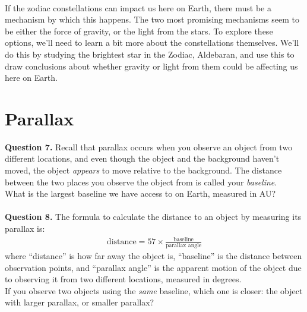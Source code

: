 \documentclass[11pt]{article}
\begin{document}
\vspace{1.5cm}
\hrulefill\\

If the zodiac constellations can impact us here on Earth, there must be a mechanism by which this happens. The two most promising mechanisms seem to be either the force of gravity, or the light from the stars. To explore these options, we'll need to learn a bit more about the constellations themselves. We'll do this by studying the brightest star in the Zodiac, Aldebaran, and use this to draw conclusions about whether gravity or light from them could be affecting us here on Earth.\\

\newpage

\section{Parallax}

\textbf{Question 7.} Recall that parallax occurs when you observe an object from two different locations, and even though the object and the background haven't moved, the object \textit{appears} to move relative to the background. The distance between the two places you observe the object from is called your \textit{baseline}.\\

What is the largest baseline we have access to on Earth, measured in AU?\\

\vspace{1.5cm}
\hrulefill\\

\textbf{Question 8.} The formula to calculate the distance to an object by measuring its parallax is:
\begin{align*}
\text{distance}=57\times \frac{\text{baseline}}{\text{parallax angle}}
\end{align*}
where ``distance'' is how far away the object is, ``baseline'' is the distance between observation points, and ``parallax angle'' is the apparent motion of the object due to observing it from two different locations, measured in degrees.\\

If you observe two objects using the \textit{same} baseline, which one is closer: the object with larger parallax, or smaller parallax? \\

\vspace{1.5cm}
\hrulefill\\
\end{document}
